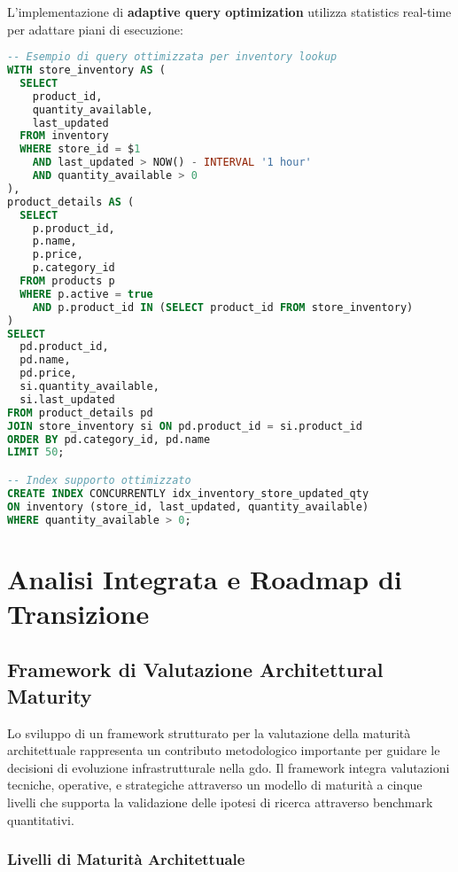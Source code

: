 L'implementazione di \textbf{adaptive query optimization} utilizza statistics real-time per adattare piani di esecuzione:

\begin{lstlisting}[language=SQL, caption=Query ottimizzata per inventory lookup, label=lst:inventory-query]
-- Esempio di query ottimizzata per inventory lookup
WITH store_inventory AS (
  SELECT 
    product_id, 
    quantity_available,
    last_updated
  FROM inventory 
  WHERE store_id = $1 
    AND last_updated > NOW() - INTERVAL '1 hour'
    AND quantity_available > 0
),
product_details AS (
  SELECT 
    p.product_id,
    p.name,
    p.price,
    p.category_id
  FROM products p
  WHERE p.active = true
    AND p.product_id IN (SELECT product_id FROM store_inventory)
)
SELECT 
  pd.product_id,
  pd.name,
  pd.price,
  si.quantity_available,
  si.last_updated
FROM product_details pd
JOIN store_inventory si ON pd.product_id = si.product_id
ORDER BY pd.category_id, pd.name
LIMIT 50;

-- Index supporto ottimizzato
CREATE INDEX CONCURRENTLY idx_inventory_store_updated_qty 
ON inventory (store_id, last_updated, quantity_available) 
WHERE quantity_available > 0;
\end{lstlisting}

\section{Analisi Integrata e Roadmap di Transizione}
\label{sec:analisi-integrata}

\subsection{Framework di Valutazione Architettural Maturity}
\label{subsec:framework-maturity}

Lo sviluppo di un framework strutturato per la valutazione della maturità architettuale rappresenta un contributo metodologico importante per guidare le decisioni di evoluzione infrastrutturale nella \gls{gdo}. Il framework integra valutazioni tecniche, operative, e strategiche attraverso un modello di maturità a cinque livelli che supporta la validazione delle ipotesi di ricerca attraverso benchmark quantitativi.

\subsubsection{Livelli di Maturità Architettuale}

